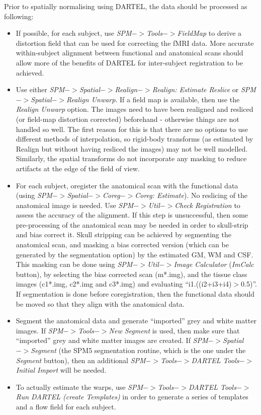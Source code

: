 Prior to spatially normalising using DARTEL, the data should be processed as following:
\begin{itemize}
\item{If possible, for each subject, use \emph{SPM$->$Tools$->$FieldMap} to derive a distortion field that can be used for correcting the fMRI data.
More accurate within-subject alignment between functional and anatomical scans should allow more of the benefits of DARTEL for inter-subject registration to be achieved.}
\item{Use either \emph{SPM$->$Spatial$->$Realign$->$Realign: Estimate Reslice} or \emph{SPM$->$Spatial$->$Realign Unwarp}.  If a field map is available, then use the \emph{Realign Unwarp} option.
The images need to have been realigned and resliced (or field-map distortion corrected) beforehand - otherwise things are not handled so well.  The first reason for this is that there are no options to use different methods of interpolation, so rigid-body transforms (as estimated by Realign but without having resliced the images) may not be well modelled.  Similarly, the spatial transforms do not incorporate any masking to reduce artifacts at the edge of the field of view.}
\item{For each subject, oregister the anatomical scan with the functional data (using \emph{SPM$->$Spatial$->$Coreg$->$Coreg: Estimate}).  No reslicing of the anatomical image is needed.
Use \emph{SPM$->$Util$->$Check Registration} to assess the accuracy of the alignment.
If this step is unsuccessful, then some pre-processing of the anatomical scan may be needed in order to skull-strip and bias correct it.
Skull stripping can be achieved by segmenting the anatomical scan, and masking a bias corrected version (which can be generated by the segmentation option) by the estimated GM, WM and CSF.  This masking can be done using \emph{SPM$->$Util$->$Image Calculator} (\emph{ImCalc} button), by selecting the bias corrected scan (m*.img), and the tissue class images (c1*.img, c2*.img and c3*.img) and evaluating ``i1.\*((i2+i3+i4)$>$0.5)''.
If segmentation is done before coregistration, then the functional data should be moved so that they align with the anatomical data.}
\item{Segment the anatomical data and generate ``imported'' grey and white matter images.
If \emph{SPM$->$Tools$->$New Segment} is used, then make sure that ``imported'' grey and white matter images are created.
If \emph{SPM$->$Spatial$->$Segment} (the SPM5 segmentation routine, which is the one under the \emph{Segment} button), then an additional \emph{SPM$->$Tools$->$DARTEL Tools$->$Initial Import} will be needed.}
\item{To actually estimate the warps, use \emph{SPM$->$Tools$->$DARTEL Tools$->$Run DARTEL (create Templates)} in order to generate a series of templates and a flow field for each subject.}
\end{itemize}

